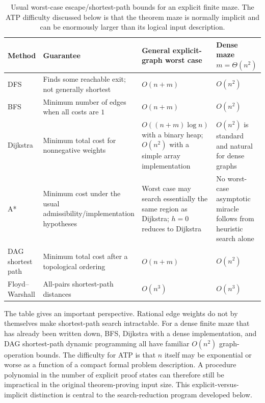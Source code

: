 \begin{table}[ht]
\centering
\small
\begin{tabularx}{\textwidth}{>{\raggedright\arraybackslash}p{2.2cm}>{\raggedright\arraybackslash}X>{\raggedright\arraybackslash}p{3.0cm}>{\raggedright\arraybackslash}p{2.5cm}}
\toprule
Method & Guarantee & General explicit-graph worst case & Dense maze $m=\Theta(n^2)$\\
\midrule
DFS & Finds some reachable exit; not generally shortest & $O(n+m)$ & $O(n^2)$\\
BFS & Minimum number of edges when all costs are $1$ & $O(n+m)$ & $O(n^2)$\\
Dijkstra & Minimum total cost for nonnegative weights & $O((n+m)\log n)$ with a binary heap; $O(n^2)$ with a simple array implementation & $O(n^2)$ is standard and natural for dense graphs\\
A* & Minimum cost under the usual admissibility/implementation hypotheses & Worst case may search essentially the same region as Dijkstra; $h=0$ reduces to Dijkstra & No worst-case asymptotic miracle follows from heuristic search alone\\
DAG shortest path & Minimum total cost after a topological ordering & $O(n+m)$ & $O(n^2)$\\
Floyd--Warshall & All-pairs shortest-path distances & $O(n^3)$ & $O(n^3)$\\
\bottomrule
\end{tabularx}
\caption{Usual worst-case escape/shortest-path bounds for an explicit finite maze. The ATP difficulty discussed below is that the theorem maze is normally implicit and can be enormously larger than its logical input description.}
\end{table}

The table gives an important perspective. Rational edge weights do not by themselves make shortest-path search intractable. For a dense finite maze that has already been written down, BFS, Dijkstra with a dense implementation, and DAG shortest-path dynamic programming all have familiar $O(n^2)$ graph-operation bounds. The difficulty for ATP is that $n$ itself may be exponential or worse as a function of a compact formal problem description. A procedure polynomial in the number of explicit proof states can therefore still be impractical in the original theorem-proving input size. This explicit-versus-implicit distinction is central to the search-reduction program developed below.

